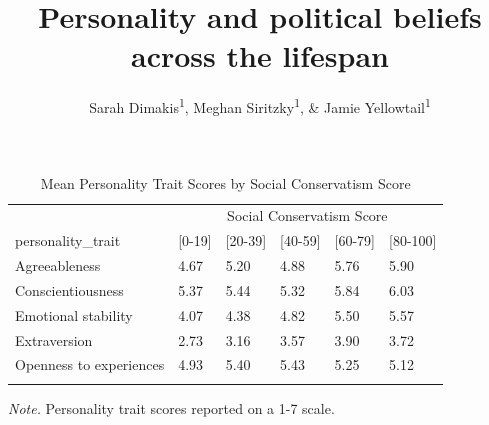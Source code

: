 \documentclass[man]{apa6}
\title{Personality and political beliefs across the lifespan}
\author{Sarah Dimakis\textsuperscript{1}, Meghan Siritzky\textsuperscript{1}, \& Jamie Yellowtail\textsuperscript{1}}
\date{}
\affiliation{
\vspace{0.5cm}
\textsuperscript{1} University of Oregon}
\begin{document}
\maketitle

\begin{table}[tbp]
\begin{center}
\begin{threeparttable}
\caption{\label{tab:table1}Mean Personality Trait Scores by Social Conservatism Score}
\begin{tabular}{llllll}
\toprule
 & \multicolumn{5}{c}{Social Conservatism Score} \\
\cmidrule(r){2-6}
personality\_trait & \multicolumn{1}{c}{[0-19]} & \multicolumn{1}{c}{[20-39]} & \multicolumn{1}{c}{[40-59]} & \multicolumn{1}{c}{[60-79]} & \multicolumn{1}{c}{[80-100]}\\
\midrule
Agreeableness & 4.67 & 5.20 & 4.88 & 5.76 & 5.90\\
Conscientiousness & 5.37 & 5.44 & 5.32 & 5.84 & 6.03\\
Emotional stability & 4.07 & 4.38 & 4.82 & 5.50 & 5.57\\
Extraversion & 2.73 & 3.16 & 3.57 & 3.90 & 3.72\\
Openness to experiences & 4.93 & 5.40 & 5.43 & 5.25 & 5.12\\
\bottomrule
\addlinespace
\end{tabular}
\begin{tablenotes}[para]
\normalsize{\textit{Note.} Personality trait scores reported on a 1-7 scale.}
\end{tablenotes}
\end{threeparttable}
\end{center}
\end{table}
\end{document}
